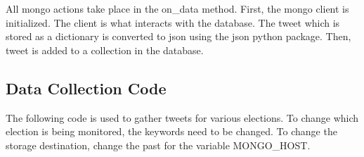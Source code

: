 \documentclass[11pt, twoside, reqno]{book}
\begin{document}
All mongo actions take place in the on\_data method. First, the mongo client is initialized. The client is what interacts with the database. The tweet which is stored as a dictionary is converted to json using the json python package. Then, tweet is added to a collection in the database.

\begin{appendices}
\chapter{Data Collection Code}

The following code is used to gather tweets for various elections. To change which election is being monitored, the keywords need to be changed. To change the storage destination, change the past for the variable MONGO\_HOST.



\end{appendices}




\end{document}
